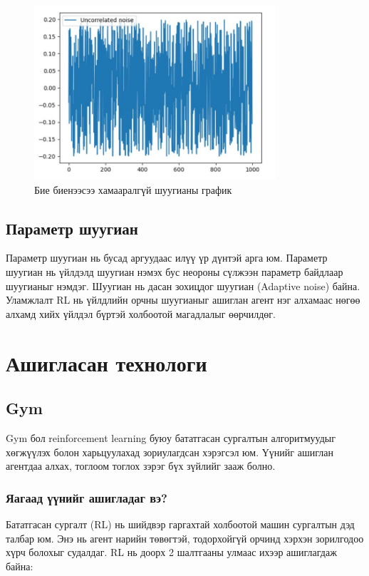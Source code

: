 \documentclass[12pt,A4]{report}
\begin{document}
\begin{figure}[H]
\centering
\includegraphics[width=0.8\textwidth]{./images/Uncorrelated_noise}
\caption{Бие биенээсээ хамааралгүй шуугианы график}
\end{figure}

\subsection{Параметр шуугиан}
 
Параметр шуугиан нь бусад аргуудаас илүү үр дүнтэй арга юм. Параметр шуугиан нь үйлдэлд шуугиан нэмэх бус неороны сүлжээн параметр байдлаар шуугианыг нэмдэг. Шуугиан нь дасан зохицдог шуугиан (Adaptive noise) байна. Уламжлалт RL нь үйлдлийн орчны шуугианыг ашиглан агент нэг алхамаас нөгөө алхамд хийх үйлдэл бүртэй холбоотой магадлалыг өөрчилдөг. 	
 
\section{Ашигласан технологи}

\subsection{Gym}

Gym бол reinforcement learning буюу бататгасан сургалтын алгоритмуудыг хөгжүүлэх болон харьцуулахад зориулагдсан хэрэгсэл юм. Үүнийг ашиглан агентдаа алхах, тоглоом тоглох зэрэг бүх зүйлийг зааж болно. 

\subsubsection{Яагаад үүнийг ашигладаг вэ?}

Бататгасан сургалт (RL) нь шийдвэр гаргахтай холбоотой машин сургалтын дэд талбар юм. Энэ нь агент нарийн төвөгтэй, тодорхойгүй орчинд хэрхэн зорилгодоо хүрч болохыг судалдаг. RL нь доорх 2 шалтгааны улмаас ихээр ашиглагдаж байна:
\end{document}
